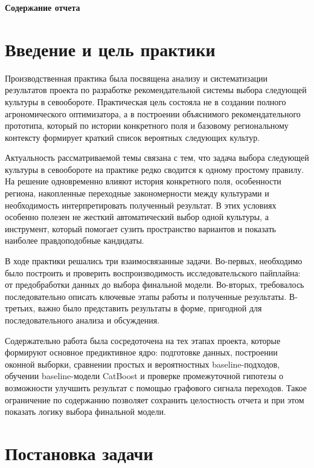 \begin{center}
\textbf{Содержание отчета}
\end{center}

\tableofcontents
\clearpage

\section{Введение и цель практики}

Производственная практика была посвящена анализу и систематизации результатов проекта по разработке рекомендательной системы выбора следующей культуры в севообороте. Практическая цель состояла не в создании полного агрономического оптимизатора, а в построении объяснимого рекомендательного прототипа, который по истории конкретного поля и базовому региональному контексту формирует краткий список вероятных следующих культур.

Актуальность рассматриваемой темы связана с тем, что задача выбора следующей культуры в севообороте на практике редко сводится к одному простому правилу. На решение одновременно влияют история конкретного поля, особенности региона, накопленные переходные закономерности между культурами и необходимость интерпретировать полученный результат. В этих условиях особенно полезен не жесткий автоматический выбор одной культуры, а инструмент, который помогает сузить пространство вариантов и показать наиболее правдоподобные кандидаты.

В ходе практики решались три взаимосвязанные задачи. Во-первых, необходимо было построить и проверить воспроизводимость исследовательского пайплайна: от предобработки данных до выбора финальной модели. Во-вторых, требовалось последовательно описать ключевые этапы работы и полученные результаты. В-третьих, важно было представить результаты в форме, пригодной для последовательного анализа и обсуждения.

Содержательно работа была сосредоточена на тех этапах проекта, которые формируют основное предиктивное ядро: подготовке данных, построении оконной выборки, сравнении простых и вероятностных baseline-подходов, обучении baseline-модели CatBoost и проверке промежуточной гипотезы о возможности улучшить результат с помощью графового сигнала переходов. Такое ограничение по содержанию позволяет сохранить целостность отчета и при этом показать логику выбора финальной модели.

\SourceNote

\section{Постановка задачи}

